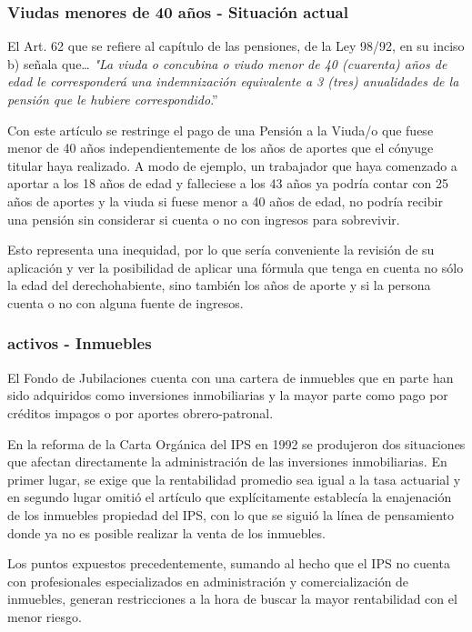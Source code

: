 \documentclass[a4paper,11pt]{article}
\begin{document}
\subsubsection{Viudas menores de 40 años - Situación actual}

El Art. 62 que se refiere al capítulo de las pensiones, de la Ley 98/92, en su inciso b) señala que… \textit{"La viuda o concubina o viudo menor de 40 (cuarenta) años de edad le corresponderá una indemnización equivalente a 3 (tres) anualidades de la pensión que le hubiere correspondido}.” 

Con este artículo se restringe el pago de una Pensión a la Viuda/o que fuese menor de 40 años independientemente de los años de aportes que el cónyuge titular haya realizado. A modo de ejemplo, un trabajador que haya comenzado a aportar a los 18 años de edad y falleciese a los 43 años ya podría contar con 25 años de aportes y la viuda si fuese menor a 40 años de edad, no podría recibir una pensión sin considerar si cuenta o no con ingresos para sobrevivir.

Esto representa una inequidad, por lo que sería conveniente la revisión de su aplicación y ver la posibilidad de aplicar una fórmula que tenga en cuenta no sólo la edad del derechohabiente, sino también los años de aporte y si la persona cuenta o no con alguna fuente de ingresos.

 \subsubsection{activos - Inmuebles}
 
 El Fondo de Jubilaciones cuenta con una cartera de inmuebles que en parte han sido adquiridos como inversiones inmobiliarias y la mayor parte como pago por créditos impagos o por aportes obrero-patronal.

En la reforma de la Carta Orgánica del IPS en 1992 se produjeron dos situaciones que afectan directamente la administración de las inversiones inmobiliarias.  En primer lugar, se exige que la rentabilidad promedio sea igual a la tasa actuarial y en segundo lugar omitió el artículo que explícitamente establecía la enajenación de los inmuebles propiedad del IPS, con lo que se siguió la línea de pensamiento donde ya no es posible realizar la venta de los inmuebles.

Los puntos expuestos precedentemente, sumando al hecho que el IPS no cuenta con profesionales especializados en administración y comercialización de inmuebles, generan restricciones a la hora de buscar la mayor rentabilidad con el menor riesgo.
\end{document}
